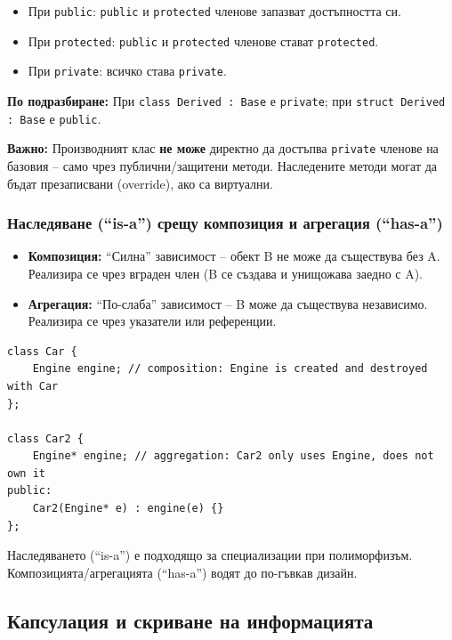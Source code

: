 \documentclass{scrartcl}
\begin{document}
\begin{FlushLeft}
\begin{itemize}
    \item При \texttt{public}: \texttt{public} и \texttt{protected} членове запазват достъпността си.
    \item При \texttt{protected}: \texttt{public} и \texttt{protected} членове стават \texttt{protected}.
    \item При \texttt{private}: всичко става \texttt{private}.
\end{itemize}

\textbf{По подразбиране:} При \texttt{class Derived : Base} е \texttt{private}; при \texttt{struct Derived : Base} е \texttt{public}.

\textbf{Важно:} Производният клас \textbf{не може} директно да достъпва \texttt{private} членове на базовия -- само чрез публични/защитени методи. Наследените методи могат да бъдат презаписвани (override), ако са виртуални.

\subsubsection{Наследяване (``is-a'') срещу композиция и агрегация (``has-a'')}

\begin{itemize}
    \item \textbf{Композиция:} ``Силна'' зависимост -- обект B не може да съществува без A. Реализира се чрез вграден член (B се създава и унищожава заедно с A).
    \item \textbf{Агрегация:} ``По-слаба'' зависимост -- B може да съществува независимо. Реализира се чрез указатели или референции.
\end{itemize}

\begin{lstlisting}
class Car {
    Engine engine; // composition: Engine is created and destroyed with Car
};

class Car2 {
    Engine* engine; // aggregation: Car2 only uses Engine, does not own it
public:
    Car2(Engine* e) : engine(e) {}
};
\end{lstlisting}

Наследяването (``is-a'') е подходящо за специализации при полиморфизъм. Композицията/агрегацията (``has-a'') водят до по-гъвкав дизайн.

\subsection{Капсулация и скриване на информацията}


\end{FlushLeft}
\end{document}
